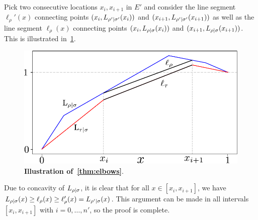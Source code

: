 \documentclass[pra,
aps,
twocolumn,
superscriptaddress,
groupedaddress,
nofootinbib,
reprint
]{revtex4-1}
\begin{document}
	Pick two consecutive locations $x_{i}, x_{i+1}$ in $E'$ and consider the line segment $\ell_\rho'(x)$ connecting points $(x_{i}, {L_{\rho'|\sigma'}}(x_{i}))$ and $(x_{i+1}, {L_{\rho'|\sigma'}}(x_{i+1}))$ as well as the line segment $\ell_\rho(x)$ connecting points $(x_{i}, {L_{\rho|\sigma}}(x_{i}))$ and $(x_{i+1}, {L_{\rho|\sigma}}(x_{i+1}))$.
	This is illustrated in~\cref{fig:elbows_proof}.
\begin{figure}[h]
    \centering
    \includegraphics[scale=0.5]{figs/elbows_proof.pdf}
    \caption{\textbf{Illustration of~\cref{thm:elbows}}.
    }
    \label{fig:elbows_proof}
\end{figure}

	Due to concavity of ${L_{\rho|\sigma}}$, it is clear that for all $x \in [x_{i}, x_{i+1}]$, we have ${L_{\rho|\sigma}}(x) \geq \ell_\rho(x) \geq \ell_\rho'(x) = {L_{\rho'|\sigma}}(x)$.
	This argument can be made in all intervals $[x_{i}, x_{i+1}]$ with $i=0,\dots,n'$, so the proof is complete.
\end{document}
